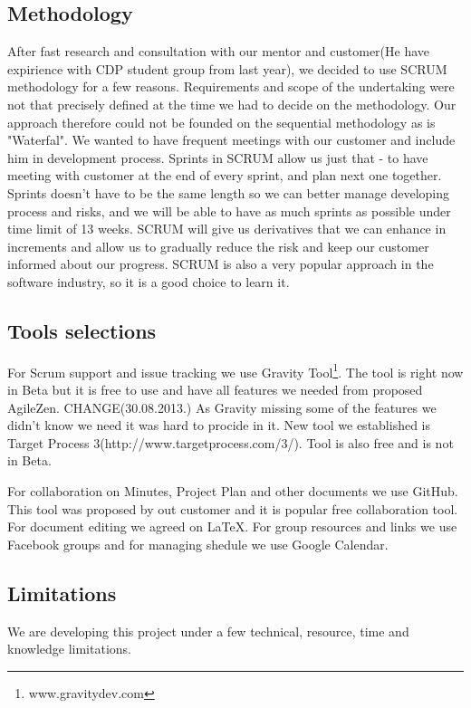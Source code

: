 \documentclass{article}
\begin{document}
\subsection{Methodology}
After fast research and consultation with our mentor and customer(He have expirience with CDP student group from last year), we decided to use SCRUM methodology for a 
few reasons. Requirements and scope of the undertaking were not that precisely defined at the time 
we had to decide on the methodology. Our approach therefore could not be founded on the sequential methodology as is "Waterfal".
We wanted to have frequent meetings with our customer and include him in development process. Sprints in SCRUM allow us just that - 
to have meeting with customer at the end of every sprint, and plan next one together. Sprints doesn't have to be the same length so 
we can better manage developing process and risks, and we will be able to have as much sprints as possible under time limit of 13 weeks. 
SCRUM will give us derivatives that we can enhance in increments and allow us to gradually reduce the risk and keep our customer informed 
about our progress. SCRUM is also a very popular approach in the software industry, so it is a good choice to learn it. 


\subsection{Tools selections}
For Scrum support and issue tracking we use Gravity Tool\footnote{www.gravitydev.com}. 
The tool is right now in Beta but it is free to use and have all features we needed from proposed AgileZen.
CHANGE(30.08.2013.) As Gravity missing some of the features we didn't know we need it was hard to procide in it.
New tool we established is Target Process 3(http://www.targetprocess.com/3/). Tool is also free and is not in Beta.

For collaboration on Minutes, Project Plan and other documents we use GitHub. This tool was proposed by out customer and it is popular free collaboration tool.
For document editing we agreed on LaTeX.
For group resources and links we use Facebook groups and for managing shedule we use Google Calendar.
 
\subsection{Limitations}
We are developing this project under a few technical, resource, time and knowledge limitations. 
\end{document}
